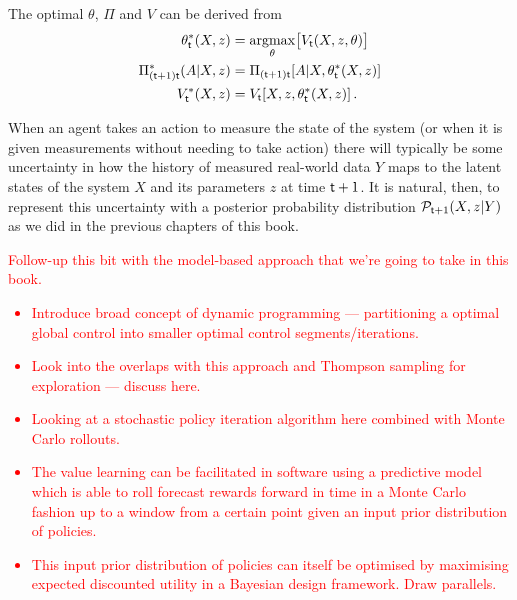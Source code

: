 The optimal $\theta$, $\Pi$ and $V$ can be derived from
\begin{align}
\theta^*_{{\sf t}}(X,z) &= \underset{\theta}{{\rm argmax}} \big[ V_{{\sf t}}(X,z,\theta)\big] \\
\Pi^*_{({\sf t}+1){\sf t}}(A\vert X,z) &= \Pi_{({\sf t}+1){\sf t}}[A\vert X,\theta^*_{{\sf t}}(X,z)] \\
V^*_{{\sf t}}(X,z) &= V_{{\sf t}}[X,z,\theta^*_{{\sf t}}(X,z)] \,.
\end{align}

When an agent takes an action to measure the state of the system (or when it is given measurements without needing to take action) there will typically be some uncertainty in how the history of measured real-world data $Y$ maps to the latent states of the system $X$ and its parameters $z$ at time ${\sf t}+1$. It is natural, then, to represent this uncertainty with a posterior probability distribution ${\cal P}_{{\sf t}+1}(X,z\vert Y)$ as we did in the previous chapters of this book.

\textcolor{red}{
Follow-up this bit with the model-based approach that we're going to take in this book.
\begin{itemize}
\item{Introduce broad concept of dynamic programming --- partitioning a optimal global control into smaller optimal control segments/iterations.}
\item{Look into the overlaps with this approach and Thompson sampling for exploration --- discuss here.}
\item{Looking at a stochastic policy iteration algorithm here combined with Monte Carlo rollouts.}
\item{The value learning can be facilitated in software using a predictive model which is able to roll forecast rewards forward in time in a Monte Carlo fashion up to a window from a certain point given an input prior distribution of policies.}
\item{This input prior distribution of policies can itself be optimised by maximising expected discounted utility in a Bayesian design framework. Draw parallels.}
\end{itemize}
}